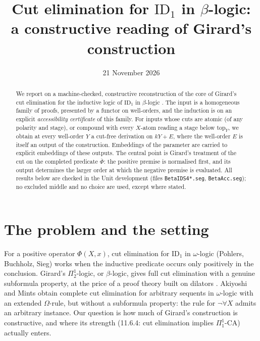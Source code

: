 \documentclass[11pt]{article}
\title{Cut elimination for $\mathrm{ID}_1$ in $\beta$-logic:\\ a constructive reading of Girard's construction}
\author{}
\date{21 November 2026}
\theoremstyle{remark}
\newcommand{\Phib}{\overline{\Phi}}
\renewcommand{\tt}[1]{\texttt{#1}}
\begin{document}
\maketitle

\begin{abstract}
We report on a machine-checked, constructive reconstruction of the core of
Girard's cut elimination for the inductive logic of $\mathrm{ID}_1$ in
$\beta$-logic \cite[\S11.4]{ptlc2}. The input is a homogeneous family of
proofs, presented by a functor on well-orders, and the induction is on an
explicit \emph{accessibility certificate} of this family. For inputs whose
cuts are atomic (of any polarity and stage), or compound with every
$X$-atom reading a stage below $\mathrm{top}_Y$, we obtain at every well-order $Y$ a cut-free
derivation on $kY+E$, where the well-order $E$ is itself an output of the
construction. Embeddings of the parameter are carried to explicit
embeddings of these outputs. The central point is Girard's treatment of
the cut on the completed predicate $\Phib$: the positive premise is
normalised first, and its output determines the larger order at which the
negative premise is evaluated. All results below are checked in the Unit
development (files \tt{BetaIDS4*.seg}, \tt{BetaAcc.seg}); no excluded
middle and no choice are used, except where stated.
\end{abstract}

\section{The problem and the setting}

For a positive operator $\Phi(X,x)$, cut elimination for $\mathrm{ID}_1$
in $\omega$-logic (Pohlers, Buchholz, Sieg) works when the inductive
predicate occurs only positively in the conclusion. Girard's
$\Pi^1_2$-logic, or $\beta$-logic, gives full cut elimination with a
genuine subformula property, at the price of a proof theory built on
dilators \cite[ch.~11]{ptlc2}. Akiyoshi and Mints \cite{am} obtain complete
cut elimination for arbitrary sequents in $\omega$-logic with an extended
$\Omega$-rule, but without a subformula property: the rule for
$\neg\forall X$ admits an arbitrary instance. Our question is how much of
Girard's construction is constructive, and where its strength
(11.6.4: cut elimination implies $\Pi^1_1$-$\mathrm{CA}$) actually enters.
\end{document}
